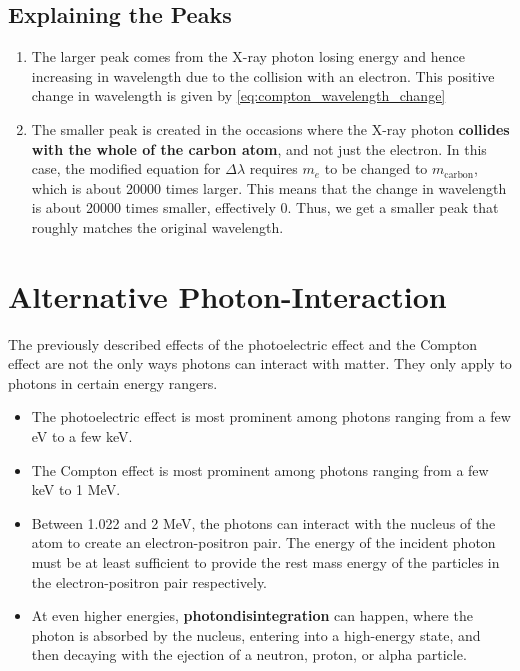 \documentclass[a4paper,12pt]{article}
\let\oldsection\section
\renewcommand\section{\clearpage\oldsection}
\begin{document}
\subsection{Explaining the Peaks}

\begin{enumerate}
  \item The larger peak comes from the X-ray photon losing energy and hence increasing in wavelength due to the collision with an electron. This positive change in wavelength is given by \cref{eq:compton_wavelength_change}
  \item The smaller peak is created in the occasions where the X-ray photon \textbf{collides with the whole of the carbon atom}, and not just the electron. In this case, the modified equation for $\Delta \lambda$ requires $m_e$ to be changed to $m_{\text{carbon}}$, which is about 20000 times larger. This means that the change in wavelength is about 20000 times smaller, effectively 0. Thus, we get a smaller peak that roughly matches the original wavelength.
\end{enumerate}

\section{Alternative Photon-Interaction}

The previously described effects of the photoelectric effect and the Compton effect are not the only ways photons can interact with matter. They only apply to photons in certain energy rangers.
\begin{itemize}
  \item The photoelectric effect is most prominent among photons ranging from a few eV to a few keV.
  \item The Compton effect is most prominent among photons ranging from a few keV to 1 MeV.
  \item Between 1.022 and 2 MeV, the photons can interact with the nucleus of the atom to create an electron-positron pair. The energy of the incident photon must be at least sufficient to provide the rest mass energy of the particles in the electron-positron pair respectively.
  \item At even higher energies, \textbf{photondisintegration} can happen, where the photon is absorbed by the nucleus, entering into a high-energy state, and then decaying with the ejection of a neutron, proton, or alpha particle.
\end{itemize}
\end{document}
